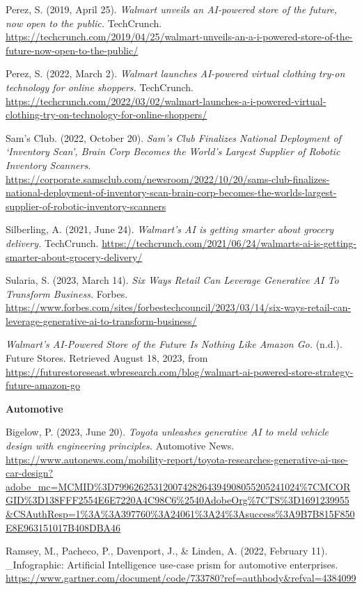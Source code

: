 \documentclass[
]{article}
\begin{document}
Perez, S. (2019, April 25). \emph{Walmart unveils an AI-powered store of the future, now open to the public.} TechCrunch. \url{https://techcrunch.com/2019/04/25/walmart-unveils-an-a-i-powered-store-of-the-future-now-open-to-the-public/}

Perez, S. (2022, March 2). \emph{Walmart launches AI-powered virtual clothing try-on technology for online shoppers.} TechCrunch. \url{https://techcrunch.com/2022/03/02/walmart-launches-a-i-powered-virtual-clothing-try-on-technology-for-online-shoppers/}

Sam's Club. (2022, October 20). \emph{Sam's Club Finalizes National Deployment of `Inventory Scan', Brain Corp Becomes the World's Largest Supplier of Robotic Inventory Scanners.} \url{https://corporate.samsclub.com/newsroom/2022/10/20/sams-club-finalizes-national-deployment-of-inventory-scan-brain-corp-becomes-the-worlds-largest-supplier-of-robotic-inventory-scanners}

Silberling, A. (2021, June 24). \emph{Walmart's AI is getting smarter about grocery delivery.} TechCrunch. \url{https://techcrunch.com/2021/06/24/walmarts-ai-is-getting-smarter-about-grocery-delivery/}

Sularia, S. (2023, March 14). \emph{Six Ways Retail Can Leverage Generative AI To Transform Business.} Forbes. \url{https://www.forbes.com/sites/forbestechcouncil/2023/03/14/six-ways-retail-can-leverage-generative-ai-to-transform-business/}

\emph{Walmart's AI-Powered Store of the Future Is Nothing Like Amazon Go.} (n.d.). Future Stores. Retrieved August 18, 2023, from \url{https://futurestoreseast.wbresearch.com/blog/walmart-ai-powered-store-strategy-future-amazon-go}

\textbf{Automotive}

Bigelow, P. (2023, June 20). \emph{Toyota unleashes generative AI to meld vehicle design with engineering principles.} Automotive News. \url{https://www.autonews.com/mobility-report/toyota-researches-generative-ai-use-car-design?adobe_mc=MCMID\%3D79962625312007428264394908055205241024\%7CMCORGID\%3D138FFF2554E6E7220A4C98C6\%2540AdobeOrg\%7CTS\%3D1691239955\&CSAuthResp=1\%3A\%3A397760\%3A24061\%3A24\%3Asuccess\%3A9B7B815F850E8E963151017B408DBA46}

Ramsey, M., Pacheco, P., Davenport, J., \& Linden, A. (2022, February 11). \_Infographic: Artificial Intelligence use-case prism for automotive enterprises.
\url{https://www.gartner.com/document/code/733780?ref=authbody\&refval=4384099}
\end{document}
